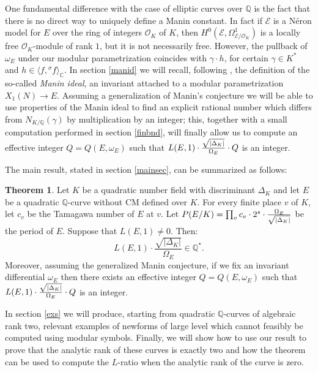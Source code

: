 \documentclass[11pt]{amsart}
\theoremstyle{definition}
\newtheorem*{Theorem*}{Theorem}
\begin{document}
	One fundamental difference with the case of elliptic curves over ${\mathbb{Q}}$ is the fact that there is no direct way to uniquely define a Manin constant. In fact if $\mathcal E$ is a N\'{e}ron model for $E$ over the ring of integers ${\mathcal{O}}_K$ of $K$, then $H^0(\mathcal E,\Omega^1_{\mathcal E/{\mathcal{O}}_K})$ is a locally free ${\mathcal{O}}_K$-module of rank $1$, but it is not necessarily free. However, the pullback of $\omega_E$ under our modular parametrization coincides with $\gamma\cdot h$, for certain $\gamma\in K^*$ and $h\in \langle f,{{}^\sigma\!} f\rangle_{\mathbb{C}}$. In section \ref{manid} we will recall, following \cite{gola}, the definition of the so-called \emph{Manin ideal}, an invariant attached to a modular parametrization $X_1(N)\to E$. Assuming a generalization of Manin's conjecture we will be able to use properties of the Manin ideal to find an explicit rational number which differs from  $N_{K/{\mathbb{Q}}}(\gamma)$ by multiplication by an integer; this, together with a small computation performed in section \ref{finbnd}, will finally allow us to compute an effective integer $Q=Q(E,\omega_E)$ such that ${\displaystyle} L(E,1)\cdot \frac{\sqrt{|\Delta_K|}}{\Omega_E}\cdot Q$ is an integer.

	The main result, stated in section \ref{mainsec}, can be summarized as follows: 
		\begin{Theorem*}
			Let $K$ be a quadratic number field with discriminant $\Delta_K$ and let $E$ be a quadratic ${\mathbb{Q}}$-curve without CM defined over $K$. For every finite place $v$ of $K$, let $c_v$ be the Tamagawa number of $E$ at $v$. Let ${\displaystyle} P(E/K)=\prod_vc_v\cdot 2^s\cdot \frac{\Omega_E}{\sqrt{|\Delta_K|}}$ be the period of $E$. Suppose that $L(E,1)\neq 0$. Then:
			$$L(E,1)\cdot \frac{\sqrt{|\Delta_K|}}{\Omega_E}\in {\mathbb{Q}}^*.$$
			Moreover, assuming the generalized Manin conjecture, if we fix an invariant differential $\omega_E$ then there exists an effective integer $Q=Q(E,\omega_E)$ such that ${\displaystyle} L(E,1)\cdot \frac{\sqrt{|\Delta_K|}}{\Omega_E}\cdot Q$ is an integer. 
	\end{Theorem*}
	In section \ref{exs} we will produce, starting from quadratic ${\mathbb{Q}}$-curves of algebraic rank two, relevant examples of newforms of large level which cannot feasibly be computed using modular symbols. Finally, we will show how to use our result to prove that the analytic rank of these curves is exactly two and how the theorem can be used to compute the $L$-ratio when the analytic rank of the curve is zero.
\end{document}
